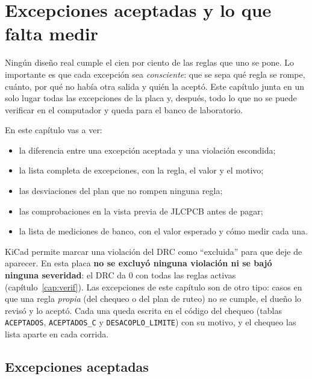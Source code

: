 \chapter{Excepciones aceptadas y lo que falta medir}\label{cap:banco}

Ningún diseño real cumple el cien por ciento de las reglas que uno se pone. Lo importante es que cada excepción sea
\emph{consciente}: que se sepa qué regla se rompe, cuánto, por qué no había otra salida y quién la aceptó. Este
capítulo junta en un solo lugar todas las excepciones de la placa y, después, todo lo que no se puede verificar en el
computador y queda para el banco de laboratorio.

En este capítulo vas a ver:
\begin{itemize}
  \item la diferencia entre una excepción aceptada y una violación escondida;
  \item la lista completa de excepciones, con la regla, el valor y el motivo;
  \item las desviaciones del plan que no rompen ninguna regla;
  \item las comprobaciones en la vista previa de JLCPCB antes de pagar;
  \item la lista de mediciones de banco, con el valor esperado y cómo medir cada una.
\end{itemize}

\begin{idea}
KiCad permite marcar una violación del DRC como ``excluida'' para que deje de aparecer. En esta placa \textbf{no se
excluyó ninguna violación ni se bajó ninguna severidad}: el DRC da 0 con todas las reglas activas
(capítulo~\ref{cap:verif}). Las excepciones de este capítulo son de otro tipo: casos en que una regla \emph{propia}
(del chequeo  o del plan de ruteo) no se cumple, el dueño lo revisó y lo aceptó. Cada una
queda escrita en el código del chequeo (tablas \texttt{ACEPTADOS}, \texttt{ACEPTADOS\_C} y
\texttt{DESACOPLO\_LIMITE}) con su motivo, y el chequeo las lista aparte en cada corrida.
\end{idea}

\section{Excepciones aceptadas}\label{sec:c12-excepciones}

